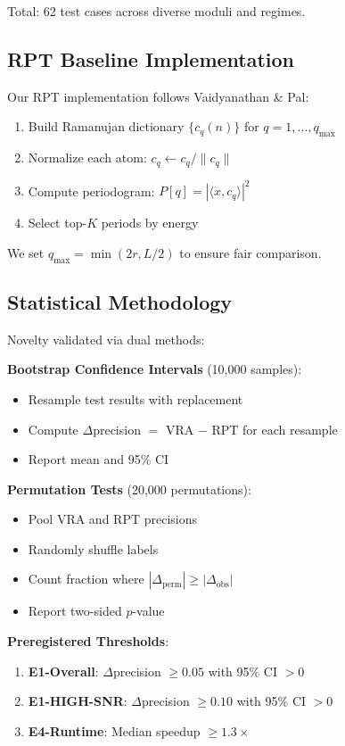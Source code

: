 \documentclass[conference]{IEEEtran}
\begin{document}
Total: 62 test cases across diverse moduli and regimes.

\subsection{RPT Baseline Implementation}

Our RPT implementation follows Vaidyanathan \& Pal\cite{vaidyanathan2014ramanujan}:
\begin{enumerate}
    \item Build Ramanujan dictionary $\{c_q(n)\}$ for $q = 1, \ldots, q_{\max}$
    \item Normalize each atom: $c_q \leftarrow c_q / \|c_q\|$
    \item Compute periodogram: $P[q] = |\langle x, c_q \rangle|^2$
    \item Select top-$K$ periods by energy
\end{enumerate}

We set $q_{\max} = \min(2r, L/2)$ to ensure fair comparison.

\subsection{Statistical Methodology}

Novelty validated via dual methods:

\textbf{Bootstrap Confidence Intervals} (10,000 samples):
\begin{itemize}
    \item Resample test results with replacement
    \item Compute $\Delta$precision $= $ VRA $-$ RPT for each resample
    \item Report mean and 95\% CI
\end{itemize}

\textbf{Permutation Tests} (20,000 permutations):
\begin{itemize}
    \item Pool VRA and RPT precisions
    \item Randomly shuffle labels
    \item Count fraction where $|\Delta_{\text{perm}}| \geq |\Delta_{\text{obs}}|$
    \item Report two-sided $p$-value
\end{itemize}

\textbf{Preregistered Thresholds}:
\begin{enumerate}
    \item \textbf{E1-Overall}: $\Delta$precision $\geq 0.05$ with 95\% CI $> 0$
    \item \textbf{E1-HIGH-SNR}: $\Delta$precision $\geq 0.10$ with 95\% CI $> 0$
    \item \textbf{E4-Runtime}: Median speedup $\geq 1.3\times$
\end{enumerate}
\end{document}

